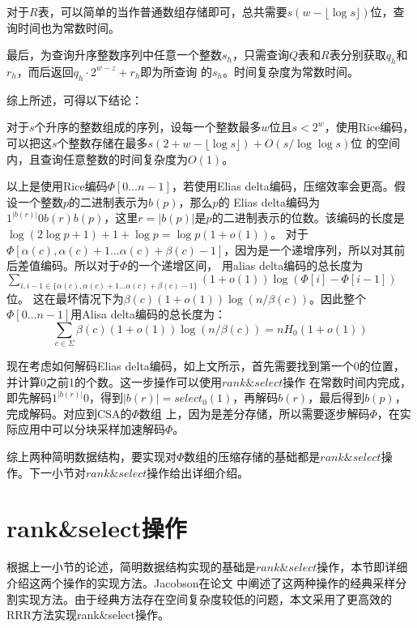 对于$R$表，可以简单的当作普通数组存储即可，总共需要$s(w-\lfloor \log s \rfloor)$位，查询时间也为常数时间。

最后，为查询升序整数序列中任意一个整数$s_h$，只需查询$Q$表和$R$表分别获取$q_h$和$r_h$，而后返回$q_h \cdot 2^{w-z}+r_h$即为所查询
的$s_h$。时间复杂度为常数时间。

综上所述，可得以下结论：
\begin{cor}\label{cor2}
对于$s$个升序的整数组成的序列，设每一个整数最多$w$位且$s<2^w$，使用Rice编码，可以把这$s$个整数存储在最多$s(2+w-\lfloor \log s \rfloor)+O(s/\log \log s)$位
的空间内，且查询任意整数的时间复杂度为$O(1)$。
\end{cor}

以上是使用Rice编码$\Phi[0\ldots n-1]$，若使用Elias delta编码，压缩效率会更高。假设一个整数$p$的二进制表示为$b(p)$，那么$p$的
Elias delta编码为$1^{|b(r)|}0b(r)b(p)$，这里$r=|b(p)|$是$p$的二进制表示的位数。该编码的长度是$\log (2\log p +1)+1+\log p =\log p(1+o(1))$。
对于$\Phi[\alpha(c),\alpha(c)+1\ldots \alpha(c)+\beta(c)-1]$，因为是一个递增序列，所以对其前后差值编码。所以对于$\Phi$的一个递增区间，
用alias delta编码的总长度为$\sum_{i,i-1 \in \{\alpha(c),\alpha(c)+1 \ldots \alpha(c)+\beta(c)-1\}} (1+o(1))\log(\Phi[i]-\Phi[i-1])$位。
这在最坏情况下为$\beta(c)(1+o(1))\log(n/\beta(c))$。因此整个$\Phi[0\ldots n-1]$用Alisa delta编码的总长度为：
\begin{equation}
\sum_{c \in \Sigma} \beta(c)(1+o(1))\log(n/\beta(c))=nH_0(1+o(1))
\end{equation}

现在考虑如何解码Elias delta编码，如上文所示，首先需要找到第一个0的位置，并计算0之前1的个数。这一步操作可以使用$rank\&select$操作
在常数时间内完成，即先解码$1^{|b(r)|}0$，得到$|b(r)|=select_0(1)$，再解码$b(r)$，最后得到$b(p)$，完成解码。对应到CSA的$\Phi$数组
上，因为是差分存储，所以需要逐步解码$\Phi$，在实际应用中可以分块采样加速解码$\Phi$。

综上两种简明数据结构，要实现对$\Phi$数组的压缩存储的基础都是$rank\&select$操作。下一小节对$rank\&select$操作给出详细介绍。

\section{rank\&select操作}

根据上一小节的论述，简明数据结构实现的基础是$rank\&select$操作，本节即详细介绍这两个操作的实现方法。Jacobson在论文\cite{jacobson1989space}
中阐述了这两种操作的经典采样分割实现方法。由于经典方法存在空间复杂度较低的问题，本文采用了更高效的RRR方法实现rank\&select操作。

